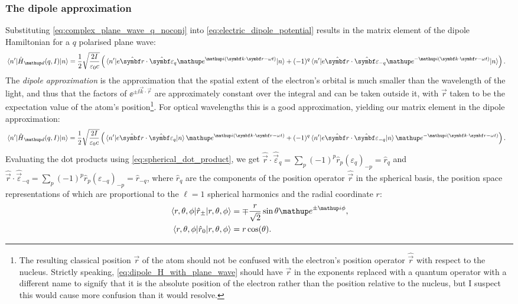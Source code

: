 \subsubsection{The dipole approximation}

Substituting \eqref{eq:complex_plane_wave_q_noconj} into \eqref{eq:electric_dipole_potential} results in the matrix element of the dipole Hamiltonian for a $q$ polarised plane wave:
\begin{align}\label{eq:dipole_H_with_plane_wave}
\matrixel{n^\prime}{\hat H_\up{d}(q,I)}{n} &= 
\frac12\sqrt{\frac{2I}{\varepsilon_0 c}}\left(
\matrixel{n^\prime}
  {e\hat{\vec r}\cdot\hat{\vec\varepsilon}_q \ee^{\ii(\vec k \cdot \vec r - \omega t)}}
  {n}
+(-1)^q
\matrixel{n^\prime}
  {e\hat{\vec r}\cdot\hat{\vec\varepsilon}_{-q} \ee^{-\ii(\vec k \cdot \vec r - \omega t)}}
  {n}\right).
\end{align}
The \emph{dipole approximation} is the approximation that the spatial extent of the electron's orbital is much smaller than the wavelength of the light, and thus that the factors of $\ee^{\pm\ii\vec k\cdot\vec r}$ are approximately constant over the integral and can be taken outside it, with $\vec r$ taken to be the expectation value of the atom's position\footnote{The resulting classical position $\vec r$ of the atom should not be confused with the electron's position operator $\hat{\vec r}$ with respect to the nucleus. Strictly speaking, \eqref{eq:dipole_H_with_plane_wave} should have $\vec r$ in the exponents replaced with a quantum operator with a different name to signify that it is the absolute position of the electron rather than the position relative to the nucleus, but I suspect this would cause more confusion than it would resolve.}. For optical wavelengths this is a good approximation, yielding our matrix element in the dipole approximation:
\begin{align}
\matrixel{n^\prime}{\hat H_\up{d}(q,I)}{n} &= 
\frac12\sqrt{\frac{2I}{\varepsilon_0 c}}\left(
\matrixel{n^\prime}
  {e\hat{\vec r}\cdot\hat{\vec\varepsilon}_q}
  {n}\ee^{\ii(\vec k \cdot \vec r - \omega t)}
+(-1)^q
\matrixel{n^\prime}
  {e\hat{\vec r}\cdot\hat{\vec\varepsilon}_{-q}}
  {n} \ee^{-\ii(\vec k \cdot \vec r - \omega t)}\right).
\end{align}
Evaluating the dot products using \eqref{eq:spherical_dot_product}, we get $\hat{\vec r}\cdot \hat{\vec\varepsilon}_q = \sum_p (-1)^p \hat r_p (\varepsilon_q)_{-p} = \hat r_q$ and $\hat{\vec r}\cdot \hat{\vec\varepsilon}_{-q} = \sum_p (-1)^p \hat r_p (\varepsilon_{-q})_{-p} = \hat r_{-q}$, where $\hat r_q$ are the components of the position operator $\hat{\vec r}$ in the spherical basis, the position space representations of which are proportional to the $\ell=1$ spherical harmonics and the radial coordinate $r$:
\begin{align}
\matrixel{r, \theta, \phi}{\hat r_\pm}{r, \theta, \phi}
    &= \mp\frac r {\sqrt2}\sin\theta\ee^{\pm\ii\phi},\\
\matrixel{r, \theta, \phi}{\hat r_0}{r, \theta, \phi} &= r\cos(\theta).
\end{align}

